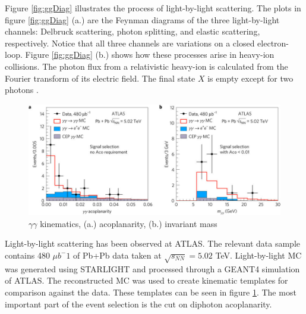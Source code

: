 Figure \ref{fig:ggDiag} illustrates the process of light-by-light scattering. The plots in figure \ref{fig:ggDiag} (a.) are the Feynman diagrams of the three light-by-light channels: Delbruck scattering, photon splitting, and elastic scattering, respectively. Notice that all three channels are variations on a closed electron-loop. Figure \ref{fig:ggDiag} (b.) shows how these processes arise in heavy-ion collisions. The photon flux from a relativistic heavy-ion is calculated from the Fourier transform of its electric field. The final state $X$ is empty except for two photons \cite{Aaboud:2017bwk}. 
\begin{figure}[h!]
\begin{centering}
\includegraphics[width=7in]{Chapter2/importfigs/nphys4208-f3.jpg}
\par\end{centering}
\caption{$\gamma \gamma$ kinematics, (a.) acoplanarity, (b.) invariant mass \cite{Aaboud:2017bwk} \label{fig:ggKin}}
\end{figure}

Light-by-light scattering has been observed at ATLAS. The relevant data sample contains 480 $\mu b^-1$ of Pb+Pb data taken at $\sqrt{s_{NN}}=5.02$ TeV. Light-by-light MC was generated using STARLIGHT and processed through a GEANT4 simulation of ATLAS. The reconstructed MC was used to create kinematic templates for comparison against the data. These templates can be seen in figure \ref{fig:ggKin}. The most important part of the event selection is the cut on diphoton acoplanarity. 

